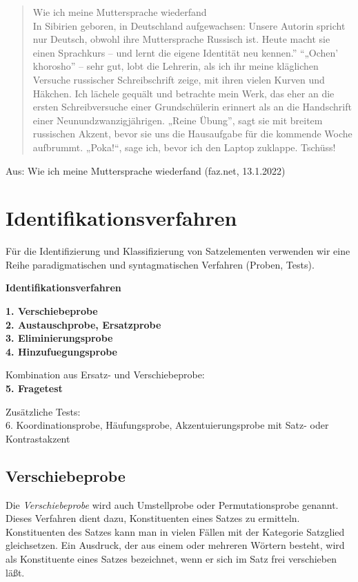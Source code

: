 \documentclass[
  letterpaper,
  DIV=11,
  numbers=noendperiod]{scrreprt}
\begin{document}
\begin{quote}
Wie ich meine Muttersprache wiederfand\\
In Sibirien geboren, in Deutschland aufgewachsen: Unsere Autorin spricht
nur Deutsch, obwohl ihre Muttersprache Russisch ist. Heute macht sie
einen Sprachkurs -- und lernt die eigene Identität neu kennen.''
``„Ochen' khorosho'' -- sehr gut, lobt die Lehrerin, als ich ihr meine
kläglichen Versuche russischer Schreibschrift zeige, mit ihren vielen
Kurven und Häkchen. Ich lächele gequält und betrachte mein Werk, das
eher an die ersten Schreibversuche einer Grundschülerin erinnert als an
die Handschrift einer Neunundzwanzigjährigen. „Reine Übung'', sagt sie
mit breitem russischen Akzent, bevor sie uns die Hausaufgabe für die
kommende Woche aufbrummt. „Poka!{}``, sage ich, bevor ich den Laptop
zuklappe. Tschüss!
\end{quote}

Aus: Wie ich meine Muttersprache wiederfand (faz.net, 13.1.2022)

\hypertarget{identifikationsverfahren}{%
\section{Identifikationsverfahren}\label{identifikationsverfahren}}

Für die Identifizierung und Klassifizierung von Satzelementen verwenden
wir eine Reihe paradigmatischen und syntagmatischen Verfahren (Proben,
Tests).

\textbf{Identifikationsverfahren}

\textbf{1. Verschiebeprobe}\\
\textbf{2. Austauschprobe, Ersatzprobe}\\
\textbf{3. Eliminierungsprobe}\\
\textbf{4. Hinzufuegungsprobe}

Kombination aus Ersatz- und Verschiebeprobe:\\
\textbf{5. Fragetest}

Zusätzliche Tests:\\
6. Koordinationsprobe, Häufungsprobe, Akzentuierungsprobe mit Satz- oder
Kontrastakzent

\hypertarget{verschiebeprobe}{%
\subsection{Verschiebeprobe}\label{verschiebeprobe}}

Die \emph{Verschiebeprobe} wird auch Umstellprobe oder Permutationsprobe
genannt. Dieses Verfahren dient dazu, Konstituenten eines Satzes zu
ermitteln. Konstituenten des Satzes kann man in vielen Fällen mit der
Kategorie Satzglied gleichsetzen. Ein Ausdruck, der aus einem oder
mehreren Wörtern besteht, wird als Konstituente eines Satzes bezeichnet,
wenn er sich im Satz frei verschieben läßt.
\end{document}
